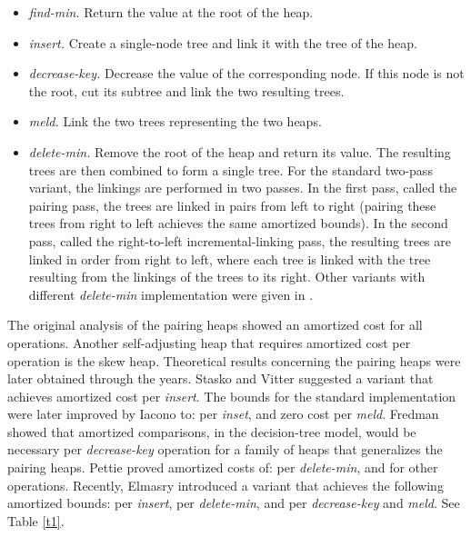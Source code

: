 \begin{itemize}
\item{\it find-min.} Return the value at the root of the heap.
\item {\it insert.} Create a single-node tree and link it with the tree of the heap.
\item {\it decrease-key.} Decrease the value of the corresponding node. If this node is not the root, cut its subtree and link the two resulting trees.
\item{\it meld.} Link the two trees representing the two heaps.
\item {\it delete-min.} Remove the root of the heap and return its value. The resulting trees are then combined to form a single tree. For the standard two-pass variant, the linkings are performed in two passes. In the first pass, called the pairing pass, the trees are linked in pairs from left to right (pairing these trees from right to left achieves the same amortized bounds). In the second pass, called the right-to-left incremental-linking pass, the resulting trees are linked in order from right to left, where each tree is linked with the tree resulting from the linkings of the trees to its right.
Other variants with different {\it delete-min} implementation were given in \cite{e, f1, fsst}.
\end{itemize}


The original analysis of the pairing heaps \cite{fsst} showed an  amortized cost for all operations.
Another self-adjusting heap that requires  amortized cost per operation \cite{st2} is the skew heap. 
Theoretical results concerning the pairing heaps were later obtained through the years.
Stasko and Vitter \cite{sv} suggested a variant that achieves  amortized cost per {\it insert}. 
The bounds for the standard implementation were later improved by Iacono \cite{ia} to:  per {\it inset}, and zero cost per {\it meld}. 
Fredman \cite{f} showed that  amortized comparisons, in the decision-tree model, would be necessary per {\it decrease-key} operation for a family of heaps that generalizes the pairing heaps. Pettie \cite{p} proved amortized costs of:  per {\it delete-min}, and  for other operations. Recently, Elmasry \cite{elm0} introduced a variant that achieves the following amortized bounds:  per {\it insert},  per {\it delete-min}, and  per {\it decrease-key} and {\it meld}. See Table \ref{t1}.


